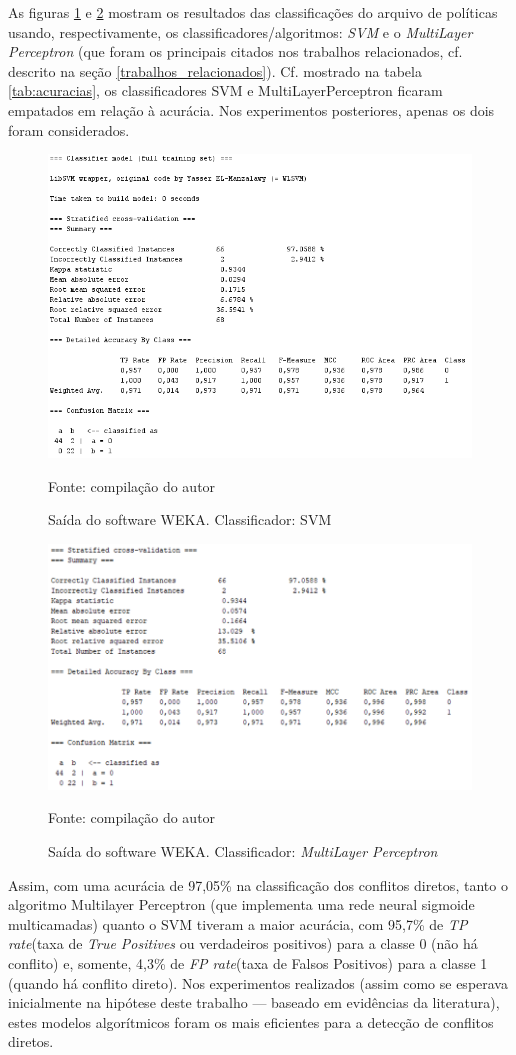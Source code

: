 As figuras \ref{fig:saida_svm} e \ref{fig:saida_multilayerperceptron} mostram os resultados das classificações do arquivo de políticas usando, respectivamente, os classificadores/algoritmos: \textit{SVM} e o \textit{MultiLayer Perceptron} (que foram os principais citados nos trabalhos relacionados, cf. descrito na seção \ref{trabalhos_relacionados}). Cf. mostrado na tabela \ref{tab:acuracias}, os classificadores SVM e MultiLayerPerceptron ficaram empatados em relação à acurácia. Nos experimentos posteriores, apenas os dois foram considerados.
\begin{figure}[h!]
	\centering
	\includegraphics[width=.7\textwidth]{imagens/svm-resultados.png}	
	\caption{Saída do software WEKA. Classificador: SVM}
	\label{fig:saida_svm}
	{\scriptsize Fonte: compilação do autor}
\end{figure}
\begin{figure}[h!]
	\centering
	\includegraphics[width=.7\textwidth]{imagens/multilayerperceptron-resultados.png}
	\caption{Saída do software WEKA. Classificador: \textit{MultiLayer Perceptron}}
	\label{fig:saida_multilayerperceptron}
	{\scriptsize Fonte: compilação do autor}
\end{figure}

Assim, com uma acurácia de 97,05\% na classificação dos conflitos diretos, tanto o algoritmo Multilayer Perceptron (que implementa uma rede neural sigmoide multicamadas) quanto o SVM tiveram a maior acurácia, com 95,7\% de \textit{TP rate}(taxa de \textit{True Positives} ou verdadeiros positivos) para a classe 0 (não há conflito) e, somente, 4,3\% de \textit{FP rate}(taxa de Falsos Positivos) para a classe 1 (quando há conflito direto). Nos experimentos realizados (assim como se esperava inicialmente na hipótese deste trabalho --- baseado em evidências da literatura), estes modelos algorítmicos foram os mais eficientes para a detecção de conflitos diretos.

